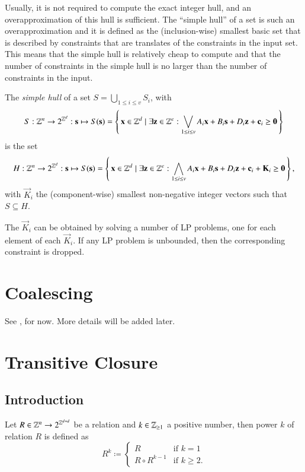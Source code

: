 Usually, it is not required to compute the exact integer hull,
and an overapproximation of this hull is sufficient.
The ``simple hull'' of a set is such an overapproximation
and it is defined as the (inclusion-wise) smallest basic set
that is described by constraints that are translates of
the constraints in the input set.
This means that the simple hull is relatively cheap to compute
and that the number of constraints in the simple hull is no
larger than the number of constraints in the input.
\begin{definition}
The {\em simple hull} of a set
$S = \bigcup_{1 \le i \le v} S_i$, with
$$
S : \Z^n \to 2^{\Z^d} : \vec s \mapsto
S(\vec s) =
\left\{\, \vec x \in \Z^d \mid \exists \vec z \in \Z^e :
\bigvee_{1 \le i \le v}
A_i \vec x + B_i \vec s + D_i \vec z + \vec c_i \geq \vec 0 \,\right\}
$$
is the set
$$
H : \Z^n \to 2^{\Z^d} : \vec s \mapsto
S(\vec s) =
\left\{\, \vec x \in \Z^d \mid \exists \vec z \in \Z^e :
\bigwedge_{1 \le i \le v}
A_i \vec x + B_i \vec s + D_i \vec z + \vec c_i + \vec K_i \geq \vec 0
\,\right\}
,
$$
with $\vec K_i$ the (component-wise) smallest non-negative integer vectors
such that $S \subseteq H$.
\end{definition}
The $\vec K_i$ can be obtained by solving a number of
LP problems, one for each element of each $\vec K_i$.
If any LP problem is unbounded, then the corresponding constraint
is dropped.

\section{Coalescing}\label{s:coalescing}

See , for now.
More details will be added later.

\section{Transitive Closure}

\subsection{Introduction}

\begin{definition}
Let $R \in \mathbb{Z}^n \to 2^{\mathbb{Z}^{d+d}}$ be a relation and
$k \in \mathbb{Z}_{\ge 1}$
a positive number, then power $k$ of relation $R$ is defined as
\begin{equation}
\label{eq:transitive:power}
R^k \coloneqq
\begin{cases}
R & \text{if $k = 1$}
\\
R \circ R^{k-1} & \text{if $k \ge 2$}
.
\end{cases}
\end{equation}
\end{definition}

